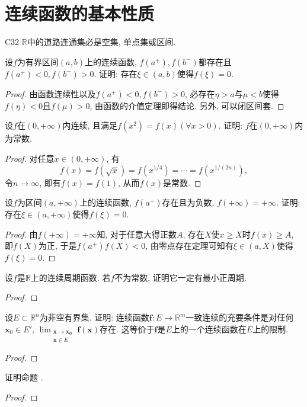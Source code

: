 \section{连续函数的基本性质}
\begin{proposition}{}{C32}
    \(\mathbb{R}\)中的道路连通集必是空集, 单点集或区间.
\end{proposition}
\begin{quiza}
\woe 设\(f\)为有界区间\((a,b)\)上的连续函数, \(f(a^+),f(b^-)\)都存在且\(f(a^+)<0,f(b^-)>0\). 证明: 存在\(\xi\in (a,b)\)使得\(f(\xi)=0\).
\begin{proof}
由函数连续性以及\(f(a^+)<0,f(b^-)>0\), 必存在\(\eta>a\)与\(\mu<b\)使得\(f(\eta)<0\)且\(f(\mu)>0\), 由函数的介值定理即得结论. 另外, 可以闭区间套.
\end{proof}
\woe 设\(f\)在\((0,+\infty)\)内连续, 且满足\(f(x^2)=f(x)(\forall x>0)\). 证明: \(f\)在\((0,+\infty)\)内为常数.
\begin{proof}
对任意\(x\in(0,+\infty)\), 有\[f(x)=f\left(\sqrt{x}\right)=f\left(x^{1/4}\right)=\cdots=f\left(x^{1/(2n)}\right),\]令\(n\rightarrow\infty\), 即有\(f(x)=f(1)\), 从而\(f(x)\)是常数.
\end{proof}
\woe 设\(f\)为区间\((a,+\infty)\)上的连续函数, \(f(a^+)\)存在且为负数, \(f(+\infty)=+\infty\). 证明: 存在\(\xi\in(a,+\infty)\)使得\(f(\xi)=0\).
\begin{proof}
由\(f(+\infty)=+\infty\)知, 对于任意大得正数\(A\), 存在\(X\)使\(x\geqslant X\)时\(f(x)\geqslant A\), 即\(f(X)\)为正, 于是\(f(a^+)f(X)<0\), 由零点存在定理可知有\(\xi\in(a,X)\)使得\(f(\xi)=0\).
\end{proof}
\woe 设\(f\)是\(\mathbb{R}\)上的连续周期函数. 若\(f\)不为常数, 证明它一定有最小正周期.
\begin{proof}

\end{proof}
\woestar 设\(E\subset\mathbb{R}^n\)为非空有界集. 证明: 连续函数\(\boldsymbol{f}:E\rightarrow\mathbb{R}^m\)一致连续的充要条件是对任何\(\boldsymbol{x}_0\in E',\,\lim_{\substack{\boldsymbol{x}\rightarrow\boldsymbol{x_0}\\\boldsymbol{x}\in E}}\boldsymbol{f}(\boldsymbol{x})\)存在. 这等价于\(\boldsymbol{f}\)是\(\overline{E}\)上的一个连续函数在\(E\)上的限制.
\begin{proof}

\end{proof}
\woe 证明命题 .
\begin{proof}
	

\end{proof}
\end{quiza}
